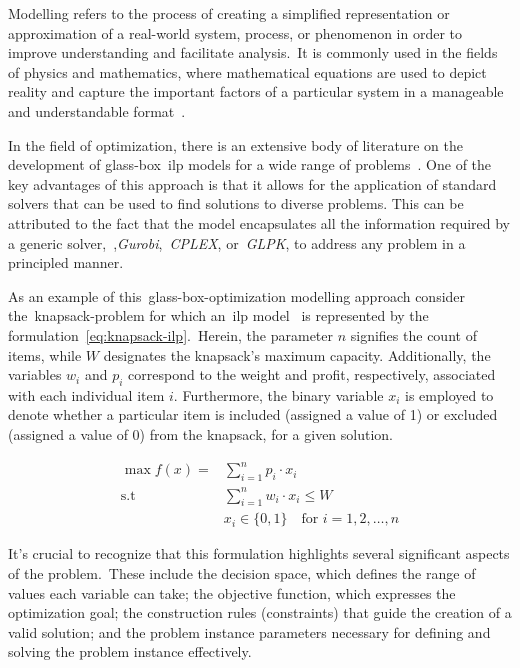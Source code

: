 Modelling refers to the process of creating a simplified representation or
approximation of a real-world system, process, or phenomenon in order to improve
understanding and facilitate analysis.~It is commonly used in the fields of
physics and mathematics, where mathematical equations are used to depict reality
and capture the important factors of a particular system in a manageable and
understandable format~\cite{witelski2015methods}.

In the field of optimization, there is an extensive body of literature on the
development of glass-box~\acrshort{ilp} models for a wide range of
problems~\cite{papadimitriou1998combinatorial,nocedal2006numerical,williamson2011design}.
One of the key advantages of this approach is that it allows for the application
of standard solvers that can be used to find solutions to diverse problems. This
can be attributed to the fact that the model encapsulates all the information
required by a generic solver,~\eg{},\textit{Gurobi},~\textit{CPLEX},
or~\textit{GLPK}, to address any problem in a principled manner.

As an example of this~\acrshort{glass-box-optimization} modelling approach
consider the~\acrshort{knapsack-problem} for which an~\acrshort{ilp}
model~\cite{yu2010combinatorial} is represented by the
formulation~\ref{eq:knapsack-ilp}.~Herein, the parameter $n$ signifies the count
of items, while $W$ designates the knapsack's maximum capacity.  Additionally,
the variables $w_{i}$ and $p_{i}$ correspond to the weight and profit,
respectively, associated with each individual item $i$. Furthermore, the binary
variable $x_{i}$ is employed to denote whether a particular item is included
(assigned a value of 1) or excluded (assigned a value of 0) from the knapsack,
for a given solution.

\begin{equation}
      \label{eq:knapsack-ilp}
      \begin{aligned}
            \max f(x) = & \sum_{i=1}^{n} p_i \cdot x_i                           \\
            \text{s.t } & \sum_{i=1}^{n} w_i \cdot x_i \leq W                    \\
                        & x_i \in \{0, 1\} \quad \text{for } i = 1, 2, \ldots, n
      \end{aligned}
\end{equation}

It's crucial to recognize that this formulation highlights several significant
aspects of the problem.~These include the decision space, which defines the
range of values each variable can take; the objective function, which expresses
the optimization goal; the construction rules (constraints) that guide the
creation of a valid solution; and the problem instance parameters necessary for
defining and solving the problem instance effectively.

